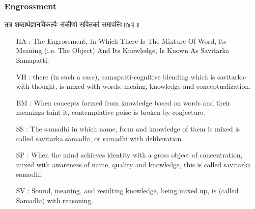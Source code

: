 \begin{frame}[fragile]\frametitle{Engrossment}
\begin{sanskrit}
तत्र शब्दार्थज्ञानविकल्पैः संकीर्णा सवितर्का समापत्तिः॥४२॥
\end{sanskrit}

	\begin{itemize}
	\item [HA]: The Engrossment, In Which There Is The Mixture Of Word, Its Meaning (i.e. The Object) And Its Knowledge, Is Known As Savitarka Samapatti.
	\item [VH]: there (in such a case), samapatti-cognitive blending which is savitarka-with thought, is mixed with words, meaing, knowledge and conceptualization.
	\item [BM]: When concepts formed from knowledge based on words and their meanings taint it, contemplative poise is broken by conjecture.
	\item [SS]: The samadhi in which name, form and knowledge of them is mixed is called savitarka samadhi, or samadhi with deliberation.
	\item [SP]: When the mind achieves identity with a gross object of concentration, mixed with awareness of name, quality and knowledge, this is called savitarka samadhi.
	\item [SV]: Sound, meaning, and resulting knowledge, being mixed up, is (called Samadhi) with reasoning.
	\end{itemize}
\end{frame}


